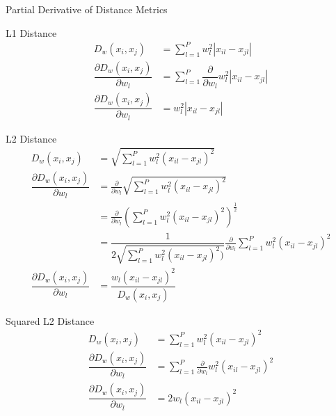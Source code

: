 \documentclass[12pt, a4paper]{article}
\begin{document}
\begin{section}{Partial Derivative of Distance Metrics}
    \begin{subsection}{L1 Distance}
        \begin{align*}
            D_w(x_i, x_j) &= \sum \limits_{l = 1}^P
                             w_l^2 \left | x_{il} - x_{jl} \right | \\
            \dfrac{\partial D_w(x_i, x_j)}{\partial w_l} 
                &= \sum \limits_{l = 1}^P \dfrac{\partial}{\partial w_l} 
                    w_l^2 \left | x_{il} - x_{jl} \right | \\
            \dfrac{\partial D_w(x_i, x_j)}{\partial w_l} 
                &= w_l^2 \left | x_{il} - x_{jl} \right |
        \end{align*}
    \end{subsection}
    \begin{subsection}{L2 Distance}
        \begin{align*}
            D_w(x_i, x_j) &= \sqrt{\sum \limits_{l = 1}^P
                                   w_l^2 \left ( x_{il} - x_{jl} \right ) ^ 2}\\
            \dfrac{\partial D_w(x_i, x_j)}{\partial w_l}
                &= \frac{\partial}{\partial w_l} \sqrt{\sum \limits_{l = 1}^P
                   w_l^2 \left ( x_{il} - x_{jl} \right ) ^ 2} \\
                &= \frac{\partial}{\partial w_l}
                   \left (\sum \limits_{l = 1}^P
                          w_l^2 \left ( x_{il} - x_{jl} \right ) ^ 2 \right )^{\frac{1}{2}}\\
                &= \dfrac{1}{2 \sqrt{ \sum \limits_{l=1}^P w_l^2 \left ( x_{il} - x_{jl} \right ) ^ 2)}}
                   \frac{\partial}{\partial w_l} \sum \limits_{l=1}^P w_l^2 \left ( x_{il} - x_{jl} \right ) ^ 2 \\
            \dfrac{\partial D_w(x_i, x_j)}{\partial w_l}
                   &= \dfrac{w_l \left (x_{il} - x_{jl} \right ) ^ 2}{D_w(x_i, x_j)}
        \end{align*}
    \end{subsection}
    \begin{subsection}{Squared L2 Distance}
        \begin{align*}
            D_w(x_i, x_j) &= \sum \limits_{l = 1}^P
                             w_l^2 \left ( x_{il} - x_{jl} \right ) ^ 2 \\
            \dfrac{\partial D_w(x_i, x_j)}{\partial w_l}
                &= \sum \limits_{l = 1}^P \frac{\partial}{\partial w_l} 
                    w_l^2 \left ( x_{il} - x_{jl} \right ) ^ 2 \\
            \dfrac{\partial D_w(x_i, x_j)}{\partial w_l}
                &= 2w_l \left (x_{il} - x_{jl} \right ) ^ 2 
        \end{align*}
    \end{subsection}
\end{section}
\end{document}
